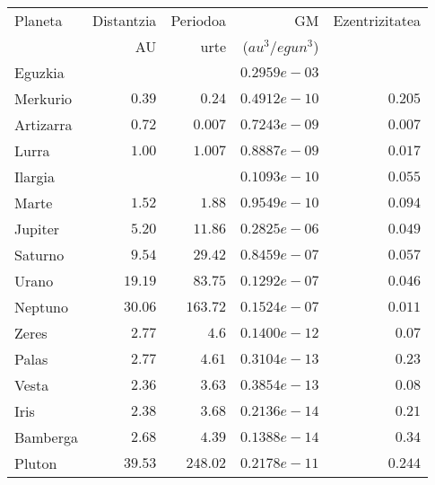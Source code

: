 \begin{table} [h!]
\caption{}
\label{tab:laskp}       %
\begin{tabular}{l r r r r } 
\hline
 Planeta   &  Distantzia   & Periodoa    & GM             & Ezentrizitatea \\   
           &   AU          &   urte      & ($au^3/egun^3$) & \\ \hline
 Eguzkia    &               &             & $0.2959e-03$   & \\          
 Merkurio   &   $0.39$      &  $0.24$     & $0.4912e-10$   & $0.205$ \\
 Artizarra  &   $0.72$      &  $0.007$    & $0.7243e-09$   & $0.007$\\
 Lurra      &   $1.00$      &  $1.007$    & $0.8887e-09$   & $0.017$\\
 Ilargia    &               &             & $0.1093e-10$   & $0.055$\\ 
 Marte      &   $1.52$      &  $1.88$     & $0.9549e-10$   & $0.094$\\ \hline
 Jupiter    &   $5.20$      &  $11.86$    & $0.2825e-06$   & $0.049$\\
 Saturno    &   $9.54$      &  $29.42$    & $0.8459e-07$   & $0.057$\\ 
 Urano      &   $19.19$     &  $83.75$    & $0.1292e-07$   & $0.046$\\
 Neptuno    &   $30.06$     &  $163.72$   & $0.1524e-07$   & $0.011$ \\ \hline
 Zeres      &   $2.77$      &  $4.6$      & $0.1400e-12$   & $0.07$ \\
 Palas      &   $2.77$      &  $4.61$     & $0.3104e-13$   & $0.23$ \\
 Vesta      &   $2.36$      &  $3.63$     & $0.3854e-13$   & $0.08$\\
 Iris       &   $2.38$      &  $3.68$     & $0.2136e-14$   & $0.21$ \\
 Bamberga   &   $2.68$      &  $4.39$     & $0.1388e-14$   & $0.34$ \\ \hline
 Pluton     &   $39.53$     &  $248.02$   & $0.2178e-11$   & $0.244$ \\
\hline
\end{tabular}
\end{table}

